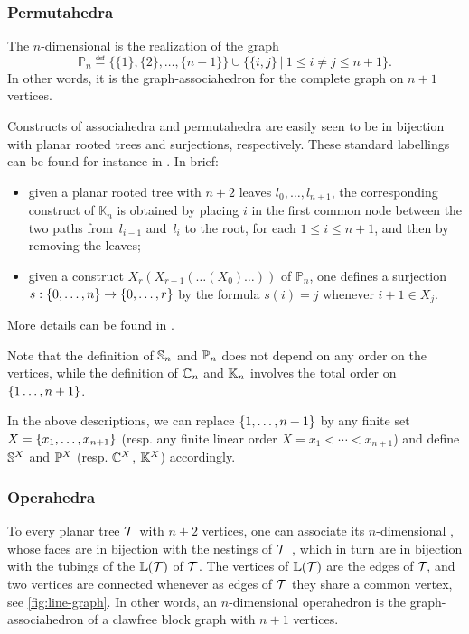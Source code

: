 \subsubsection{Permutahedra}
The $n$-dimensional  is the realization of the graph 
$$\mathbb{P}_n\eqdef  \{\{1\},\{2\},\ldots,\{n+1\}\} \cup \{\{i,j\} \ | \ 1 \leq i \neq j \leq n+1 \}.$$
In other words, it is the graph-associahedron for the complete graph on $n+1$ vertices.

\smallskip
Constructs of associahedra and permutahedra are easily seen to be in bijection with planar rooted trees and surjections, respectively.
These standard labellings can be found for instance in \cite{PalaciosRonco}. 
In brief:
\begin{itemize} 
\item given a planar rooted tree with $n+2$ leaves $l_0,\ldots,l_{n+1}$, the corresponding construct of $\mathbb{K}_n$ is obtained by placing $i$ in the first common node between the two paths from~$l_{i-1}$ and~$l_i$ to the root, for each $1 \leq i \leq n+1$, and then by removing the leaves;
\item given a construct $X_r(X_{r-1}(\ldots(X_0)\ldots))$ of $\mathbb{P}_n$, one defines a surjection $s:\left\{0,\ldots,n\right\}\rightarrow \left\{0,\ldots,r\right\}$ by the formula $s(i)=j$ whenever $i+1\in X_j$.
\end{itemize}
More details can be found in \cite[Section 2.6]{COI}.

\smallskip
Note that the definition of ${\mathbb S}_n$ and ${\mathbb P}_n$ does not depend on any order on the vertices, while the definition of ${\mathbb C}_n$ and ${\mathbb K}_n$ involves the total order on~$\left\{1\ldots,n+1\right\}$. 

\begin{remark}
  In the above descriptions, we can replace $\left\{1,\ldots,n+1\right\}$ by any finite set $X=\left\{x_1,\ldots,x_{n+1}\right\}$  (resp. any finite linear order $X=x_1<\cdots<x_{n+1}$)  and define ${\mathbb S}^X$ and ${\mathbb P}^X$ (resp. ${\mathbb C}^X$, ${\mathbb K}^X$) accordingly.
\end{remark}


\subsubsection{Operahedra}
To every  planar tree $\mathcal{T}$ with $n+2$ vertices, one can associate its $n$-dimensional , whose faces are in bijection with the nestings of $\mathcal{T}$ \cite{laplante-anfossiDiagonalOperahedra2022a,CLA1}, which in turn
are in bijection with the tubings of the  $\mathbb{L}(\mathcal{T})$ of $\mathcal{T}$.
The vertices of $\mathbb{L}(\mathcal{T})$ are the edges of ${\cal T}\!$, and two vertices are connected whenever as edges of ${\cal T}$ they share a common vertex, see \cref{fig:line-graph}.
In other words, an $n$-dimensional operahedron is the graph-associahedron of a clawfree block graph with $n+1$ vertices.

